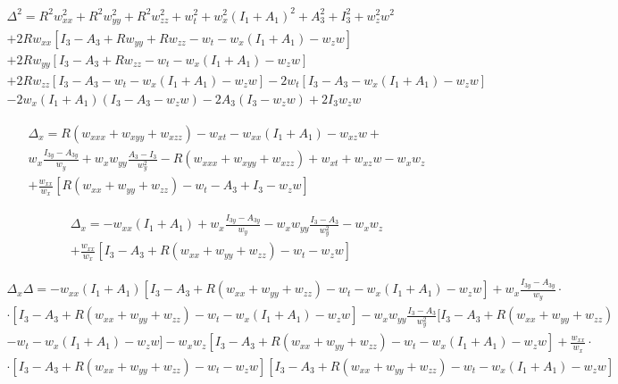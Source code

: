 \documentclass[12pt,a4paper]{article}
\begin{document}

	\begin{multline}
	  \Delta^2 = R^2 w_{xx}^2 + R^2 w_{yy}^2 + R^2 w_{zz}^2 + w_t^2 + w_x^2 \left( I_1 + A_1 \right)^2 + A_3^2 + I_3^2 + w_z^2 w^2 \\
	  + 2 R w_{xx} \left[ I_3 - A_3 + R w_{yy} + R w_{zz} - w_t - w_x \left( I_1 + A_1 \right) - w_z w \right] \\
	  + 2 R w_{yy} \left[ I_3 - A_3 + R w_{zz} - w_t - w_x \left( I_1 + A_1 \right) - w_z w \right] \\
	  + 2 R w_{zz} \left[ I_3 - A_3 - w_t - w_x \left( I_1 + A_1 \right) - w_z w \right]
	  - 2 w_t \left[ I_3 - A_3 - w_x \left( I_1 + A_1 \right) - w_z w \right] \\
	  - 2 w_x \left( I_1 + A_1 \right) \left( I_3 - A_3 - w_z w \right)
	  - 2 A_3 \left( I_3 - w_z w \right)
	  + 2 I_3 w_z w
	\end{multline}

	\begin{multline}
	  \Delta_x = R \left(w_{xxx} + w_{xyy} + w_{xzz} \right) - w_{xt} - w_{xx} \left( I_1 + A_1 \right) - w_{xz} w + \\
w_x \frac{I_{3y} - A_{3y}}{w_y} + w_x w_{yy} \frac{A_3 - I_3}{w_y^2} - R \left(w_{xxx} + w_{xyy} + w_{xzz} \right) + w_{xt} + w_{xz} w - w_x w_z \\
	  + \frac{w_{xx}}{w_x} [ R \left(w_{xx} + w_{yy} + w_{zz} \right) - w_t - A_3 + I_3 - w_z w ]
	\end{multline}

	\begin{multline}
	  \Delta_x = - w_{xx} \left( I_1 + A_1 \right) +
w_x \frac{I_{3y} - A_{3y}}{w_y} - w_x w_{yy} \frac{I_3 - A_3}{w_y^2} - w_x w_z \\
	  + \frac{w_{xx}}{w_x} [ I_3 - A_3 + R \left(w_{xx} + w_{yy} + w_{zz} \right) - w_t - w_z w ]
	\end{multline}

	\begin{multline}
	  \Delta_x \Delta =
	  - w_{xx} \left( I_1 + A_1 \right) \left[ I_3 - A_3 + R \left(w_{xx} + w_{yy} + w_{zz} \right) - w_t - w_x \left( I_1 + A_1 \right) - w_z w \right]
	  + w_x \frac{I_{3y} - A_{3y}}{w_y} \cdot \\
	  \cdot \left[ I_3 - A_3 + R \left(w_{xx} + w_{yy} + w_{zz} \right) - w_t - w_x \left( I_1 + A_1 \right) - w_z w \right]
	  - w_x w_{yy} \frac{I_3 - A_3}{w_y^2} [ I_3 - A_3 + R \left(w_{xx} + w_{yy} + w_{zz} \right) \\
	  - w_t - w_x \left( I_1 + A_1 \right) - w_z w ]
	  - w_x w_z \left[ I_3 - A_3 + R \left(w_{xx} + w_{yy} + w_{zz} \right) - w_t - w_x \left( I_1 + A_1 \right) - w_z w \right]
	  + \frac{w_{xx}}{w_x} \cdot \\
		\cdot [ I_3 - A_3 + R \left(w_{xx} + w_{yy} + w_{zz} \right) - w_t - w_z w ] \left[ I_3 - A_3 + R \left(w_{xx} + w_{yy} + w_{zz} \right) - w_t - w_x \left( I_1 + A_1 \right) - w_z w \right]
	\end{multline}
\end{document}
